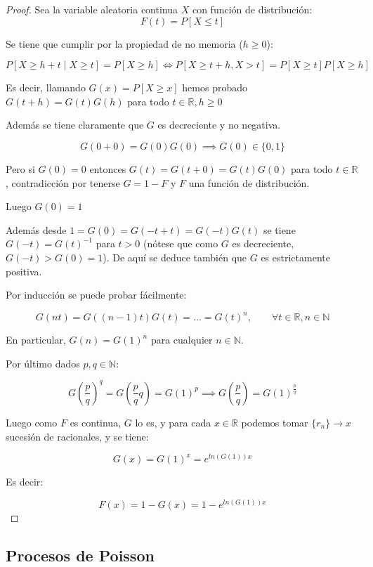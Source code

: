 \documentclass[a4paper,10pt]{scrartcl}
\theoremstyle{definition}
\numberwithin{equation}{section}
\begin{document}
\begin{proof}
 Sea la variable aleatoria continua $X$ con función de distribución: \[F(t) = P[X\le t]\]
 
 Se tiene que cumplir por la propiedad de no memoria ($h\ge 0$):
 
 \[P[X \ge h + t \mid X \ge t] = P[X \ge h] \Leftrightarrow P[X \ge t + h, X > t] = P[X \ge t] P[X \ge h]\]
 
  Es decir, llamando $G(x) = P[X \ge x]$ hemos probado $G(t+h) = G(t) G(h)$ para todo $t\in \mathbb{R}, h \ge 0$
 
  Además se tiene claramente que $G$ es decreciente y no negativa.
  
  \[G(0 + 0) = G(0)G(0) \implies G(0) \in \{0,1\}\]
  
  Pero si $G(0) = 0$ entonces $G(t) = G(t+0) = G(t)G(0)$ para todo $t\in \mathbb{R}$, contradicción por tenerse $G = 1-F$ y $F$ una función de distribución.
  
  Luego $G(0) = 1$
  
  Además desde $1 = G(0) = G(-t + t) = G(-t) G(t)$ se tiene $G(-t) = G(t)^{-1}$ para $t > 0$ (nótese que como $G$ es decreciente, $G(-t) > G(0) = 1$). De aquí se deduce también
  que $G$ es estrictamente positiva.
  
  Por inducción se puede probar fácilmente:
  
  \[G(nt) = G((n-1)t) G(t) = \ldots = G(t)^{n}, \qquad \forall t\in \mathbb{R}, n\in \mathbb{N}\]

  En particular, $G(n) = G(1)^n$ para cualquier $n\in \mathbb{N}$.
  
  Por último dados $p,q \in \mathbb{N}$:
  
  \[G\left(\frac{p}{q}\right)^q = G\left(\frac{p}{q} q\right) = G(1)^p \implies G\left(\frac{p}{q}\right) = G(1)^{\frac{p}{q}}\]
  
  Luego como $F$ es continua, $G$ lo es, y para cada $x \in \mathbb{R}$ podemos tomar $\{r_n\} \rightarrow x$ sucesión de racionales,
  y se tiene:
  
  \[G(x) = G(1)^x = e^{ln(G(1)) x}\]
  
  Es decir:
  
  \[F(x) = 1 - G(x) = 1 - e^{ln(G(1)) x}\]
  
\end{proof}


\subsection{Procesos de Poisson}
\end{document}
